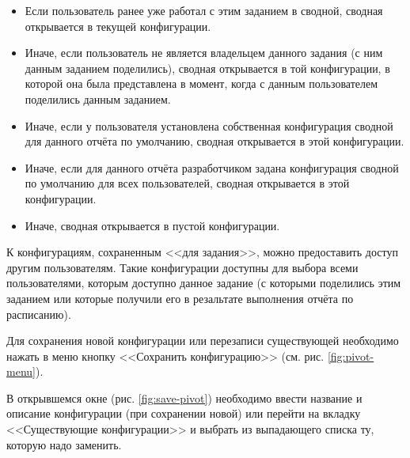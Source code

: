 \documentclass[../user-manual.tex]{subfiles}
\begin{document}
	\begin{itemize}
		
		\item Если пользователь ранее уже работал с этим заданием в сводной, сводная открывается в текущей конфигурации.
		
		\item Иначе, если пользователь не является владельцем данного задания (с ним данным заданием поделились), сводная открывается в той конфигурации, в которой она была представлена в момент, когда с данным пользователем поделились данным заданием.
		
		\item Иначе, если у пользователя установлена собственная конфигурация сводной для данного отчёта по умолчанию, сводная открывается в этой конфигурации.
		
		\item Иначе, если для данного отчёта разработчиком задана конфигурация сводной по умолчанию для всех пользователей, сводная открывается в этой конфигурации.
		
		\item Иначе, сводная открывается в пустой конфигурации.
		
	\end{itemize}
	
	К конфигурациям, сохраненным <<для задания>>, можно предоставить доступ другим пользователям. Такие конфигурации доступны для выбора всеми пользователями, которым доступно данное задание (с которыми поделились этим заданием или которые получили его в резальтате выполнения отчёта по расписанию).
	
	Для сохранения новой конфигурации или перезаписи существующей необходимо нажать в меню кнопку <<Сохранить конфигурацию>> (см. рис. \ref{fig:pivot-menu}).
	
	В открывшемся окне (рис. \ref{fig:save-pivot}) необходимо ввести название и описание конфигурации (при сохранении новой) или перейти на вкладку <<Существующие конфигурации>> и выбрать из выпадающего списка ту, которую надо заменить.
	
\end{document}
